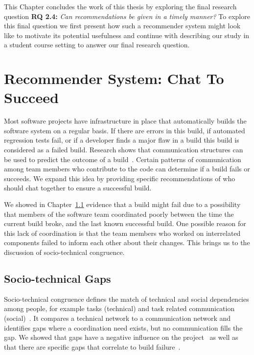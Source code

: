 \label{chap:actionable}
This Chapter concludes the work of this thesis by exploring the final research question \textbf{RQ 2.4:} \emph{Can recommendations be given in a timely manner?}
To explore this final question we first present how such a recommender system might look like to motivate its potential usefulness and continue with describing our study in a student course setting to answer our final research question.

\section{Recommender System: Chat To Succeed}
Most software projects have infrastructure in place that automatically builds the software system on a regular basis. 
If there are errors in this build, if automated regression tests fail, or if a developer finds a major flaw in a build this build is considered as a failed build.  
Research shows that communication structures can be used to predict the outcome of a build~\cite{wolf:icse:2009}.  
Certain patterns of communication among team members who contribute to the code can determine if a build fails or succeeds. 
We expand this idea by providing specific recommendations of who should chat together to ensure a successful build.

We showed in Chapter~\ref{} evidence that a build might fail due to a possibility that members of the software team coordinated poorly between the time the current build broke, and the last known successful build. 
One possible reason for this lack of coordination is that the team members who worked on interrelated components failed to inform each other about their changes. 
This brings us to the discussion of socio-technical congruence.

\subsection{Socio-technical Gaps}
Socio-technical congruence defines the match of technical and social dependencies among people, for example tasks (technical) and task related communication (social)~\cite{cataldo:cscw:2006}. 
It compares a technical network to a communication network and identifies gaps where a coordination need exists, but no communication fills the gap. 
We showed that gaps have a negative influence on the project~\cite{} as well as that there are specific gaps that correlate to build failure~\cite{}. 

